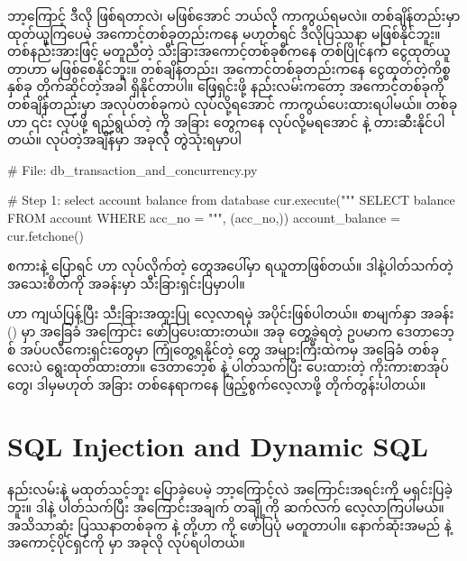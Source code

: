 ဘာ့ကြောင့် ဒီလို ဖြစ်ရတာလဲ၊ မဖြစ်အောင် ဘယ်လို ကာကွယ်ရမလဲ။ တစ်ချိန်တည်းမှာ ထုတ်ယူကြပေမဲ့ အကောင့်တစ်ခုတည်းကနေ မဟုတ်ရင်  ဒီလိုပြဿနာ မဖြစ်နိုင်ဘူး။ တစ်နည်းအားဖြင့် မတူညီတဲ့ သီးခြားအကောင့်တစ်ခုစီကနေ တစ်ပြိုင်နက် ငွေထုတ်ယူတာဟာ  မဖြစ်စေနိုင်ဘူး။ တစ်ချိန်တည်း၊ အကောင့်တစ်ခုတည်းကနေ ငွေထုတ်တဲ့ကိစ္စနှစ်ခု တိုက်ဆိုင်တဲ့အခါ  ရှိနိုင်တာပါ။ ဖြေရှင်းဖို့ နည်းလမ်းကတော့ အကောင့်တစ်ခုကို တစ်ချိန်တည်းမှာ အလုပ်တစ်ခုကပဲ  လုပ်လို့ရအောင် ကာကွယ်ပေးထားရပါမယ်။  တစ်ခုဟာ ၎င်း  လုပ်ဖို့ ရည်ရွယ်တဲ့  ကို အခြား  တွေကနေ  လုပ်လို့မရအောင်  နဲ့ တားဆီးနိုင်ပါတယ်။  လုပ်တဲ့အချိန်မှာ အခုလို တွဲသုံးရမှာပါ    
%
\begin{py}
# File: db_transaction_and_concurrency.py

# Step 1: select account balance from database
cur.execute("""
    SELECT balance FROM account WHERE acc_no = %
""", (acc_no,))
account_balance = cur.fetchone()
\end{py}
% 
 စကားနဲ့ ပြောရင်  ဟာ  လုပ်လိုက်တဲ့  တွေအပေါ်မှာ  ရယူတာဖြစ်တယ်။ ဒါနဲ့ပါတ်သက်တဲ့ အသေးစိတ်ကို  အခန်းမှာ သီးခြားရှင်းပြမှာပါ။ 

 ဟာ ကျယ်ပြန့်ပြီး သီးခြားအထူးပြု လေ့လာရမဲ့ အပိုင်းဖြစ်ပါတယ်။ စာမျက်နှာ \fRefNo{\pageref{ch:concurrency}} အခန်း (\fRefNo{\ref{ch:concurrency}}) မှာ အခြေခံ  အကြောင်း ဖော်ပြပေးထားတယ်။ အခု တွေ့ခဲ့ရတဲ့ ဥပမာက ဒေတာဘေ့စ် အပ်ပလီကေးရှင်းတွေမှာ ကြုံတွေ့ရနိုင်တဲ့  တွေ အများကြီးထဲကမှ အခြေခံ တစ်ခုလေးပဲ ရွေးထုတ်ထားတာ။ ဒေတာဘေ့စ်  နဲ့ ပါတ်သက်ပြီး ပေးထားတဲ့ ကိုးကားစာအုပ်တွေ၊ ဒါမှမဟုတ် အခြား တစ်နေရာကနေ ဖြည့်စွက်လေ့လာဖို့ တိုက်တွန်းပါတယ်။ 

\section{SQL Injection and Dynamic SQL}
 နည်းလမ်းနဲ့  မထုတ်သင့်ဘူး ပြောခဲ့ပေမဲ့ ဘာ့ကြောင့်လဲ အကြောင်းအရင်းကို မရှင်းပြခဲ့ဘူး။ ဒါနဲ့ ပါတ်သက်ပြီး အကြောင်းအချက် တချို့ကို ဆက်လက် လေ့လာကြပါမယ်။ အသိသာဆုံး ပြဿနာတစ်ခုက  နဲ့  တို့ဟာ  ကို ဖော်ပြပုံ မတူတာပါ။ နောက်ဆုံးအမည်  နဲ့ အကောင့်ပိုင်ရှင်ကို  မှာ အခုလို  လုပ်ရပါတယ်။ 


